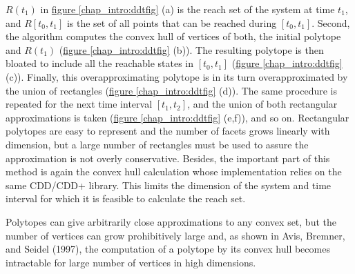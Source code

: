 \documentclass[letterpaper,10pt,english]{sphinxmanual}
\begin{document}
$R(t_1)$ in \hyperref[chap_intro:ddtfig]{figure  \ref*{chap_intro:ddtfig}} (a) is the reach set of the system at
time $t_1$, and $R[t_0, t_1]$ is the set of all points that
can be reached during $[t_0, t_1]$. Second, the algorithm computes
the convex hull of vertices of both, the initial polytope and
$R(t_1)$ (\hyperref[chap_intro:ddtfig]{figure  \ref*{chap_intro:ddtfig}} (b)). The resulting polytope is then
bloated to include all the reachable states in $[t_0,t_1]$ (\hyperref[chap_intro:ddtfig]{figure  \ref*{chap_intro:ddtfig}} (c)).
Finally, this overapproximating polytope is in its turn
overapproximated by the union of rectangles (\hyperref[chap_intro:ddtfig]{figure  \ref*{chap_intro:ddtfig}} (d)). The
same procedure is repeated for the next time interval $[t_1,t_2]$,
and the union of both rectangular approximations is taken (\hyperref[chap_intro:ddtfig]{figure  \ref*{chap_intro:ddtfig}} (e,f)),
and so on. Rectangular polytopes are easy to represent
and the number of facets grows linearly with dimension, but a large
number of rectangles must be used to assure the approximation is not
overly conservative. Besides, the important part of this method is again
the convex hull calculation whose implementation relies on the same
CDD/CDD+ library. This limits the dimension of the system and time
interval for which it is feasible to calculate the reach set.

Polytopes can give arbitrarily close approximations to any convex set,
but the number of vertices can grow prohibitively large and, as shown in
Avis, Bremner, and Seidel (1997), the computation of a polytope by its
convex hull becomes intractable for large number of vertices in high
dimensions.
\end{document}
